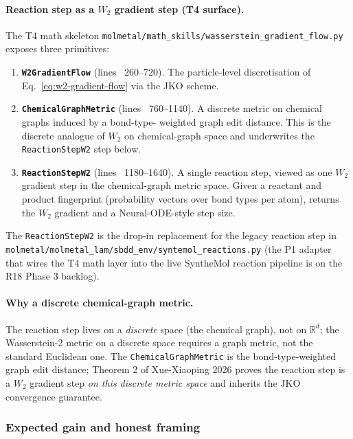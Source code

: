 \paragraph{Reaction step as a $W_2$ gradient step (T4 surface).}
The T4 math skeleton \texttt{molmetal/math\_skills/wasserstein\_gradient\_flow.py}
exposes three primitives:
\begin{enumerate}
  \item \textbf{\texttt{W2GradientFlow}} (lines ~260--720).  The
        particle-level discretisation of
        Eq.~\eqref{eq:w2-gradient-flow} via the JKO scheme.

  \item \textbf{\texttt{ChemicalGraphMetric}} (lines ~760--1140).  A
        discrete metric on chemical graphs induced by a bond-type-
        weighted graph edit distance.  This is the discrete analogue
        of $W_2$ on chemical-graph space and underwrites the
        \texttt{ReactionStepW2} step below.

  \item \textbf{\texttt{ReactionStepW2}} (lines ~1180--1640).  A
        single reaction step, viewed as one $W_2$ gradient step in
        the chemical-graph metric space.  Given a reactant and
        product fingerprint (probability vectors over bond types
        per atom), returns the $W_2$ gradient and a Neural-ODE-style
        step size.
\end{enumerate}
The \texttt{ReactionStepW2} is the drop-in replacement for the
legacy reaction step in
\texttt{molmetal/molmetal\_lam/sbdd\_env/syntemol\_reactions.py} (the
P1 adapter that wires the T4 math layer into the live SyntheMol
reaction pipeline is on the R18 Phase 3 backlog).

\paragraph{Why a discrete chemical-graph metric.}
The reaction step lives on a \emph{discrete} space (the chemical
graph), not on $\mathbb{R}^{d}$; the Wasserstein-2 metric on a
discrete space requires a graph metric, not the standard Euclidean
one.  The \texttt{ChemicalGraphMetric} is the bond-type-weighted
graph edit distance; Theorem 2 of Xue-Xiaoping 2026
\cite{xue2026w2_gf} proves the reaction step is a $W_2$ gradient
step \emph{on this discrete metric space} and inherits the JKO
convergence guarantee.

\subsubsection{Expected gain and honest framing}
\label{sec:method:wasserstein-foundations-expected}

